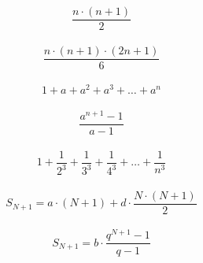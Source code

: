 \documentclass[32pt]{article}
\begin{document}
$$\frac{n\cdot(n+1)}{2}$$\\

$$\frac{n\cdot(n+1)\cdot(2n+1)}{6}$$
\\
$$1+a+a^2+a^3+\dots +a^n$$
\\
$$\frac{a^{n+1}-1}{a-1}$$\\

$$1 + \frac{1}{2^3} + \frac{1}{3^3} + \frac{1}{4^3} + \dots + \frac{1}{n^3}$$\\

$$S_{N+1}=a\cdot (N+1) + d\cdot \frac{N\cdot(N+1)}{2}$$\\

$$S_{N+1}=b\cdot\frac{q^{N+1}-1}{q-1}$$
\end{document}
